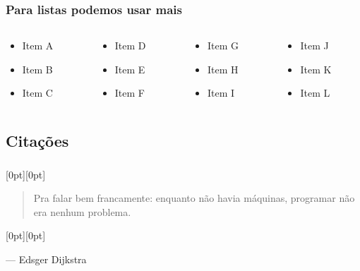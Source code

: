 \documentclass[aspectratio=169]{beamer}
\begin{document}
\begin{frame}[t]
  \subsubsection{Para listas podemos usar mais}
  \begin{columns}[T]
    \begin{column}{.25\textwidth}
      \begin{itemize}
        \item Item A
        \item Item B
        \item Item C
      \end{itemize}
    \end{column}
    \begin{column}{.25\textwidth}
      \begin{itemize}
        \item Item D
        \item Item E
        \item Item F
      \end{itemize}
    \end{column}
    \begin{column}{.25\textwidth}
      \begin{itemize}
        \item Item G
        \item Item H
        \item Item I
      \end{itemize}
    \end{column}
    \begin{column}{.25\textwidth}
      \begin{itemize}
        \item Item J
        \item Item K
        \item Item L
      \end{itemize}
    \end{column}
  \end{columns}
\end{frame}

\subsection{Citações}
\newcommand{\bquote}{\raisebox{0pt}[0pt][0pt]{\raisebox{-0.5cm}{\Huge~\verdito{\textrm{``}}}}\par}
\newcommand{\equote}{\hspace*{\fill}\raisebox{0pt}[0pt][0pt]{\raisebox{0.25cm}{\Huge\verdito{\textrm{''}}}}\par\vspace*{-\parskip}}
\begin{frame}[c]\frametitle{\secname}\framesubtitle{\subsecname}
  \bquote
  \begin{quote}
    Pra falar bem francamente: enquanto não havia máquinas, programar não era nenhum problema.
  \end{quote}
  \equote
  --- Edsger Dijkstra\raggedleft
\end{frame}
\end{document}
